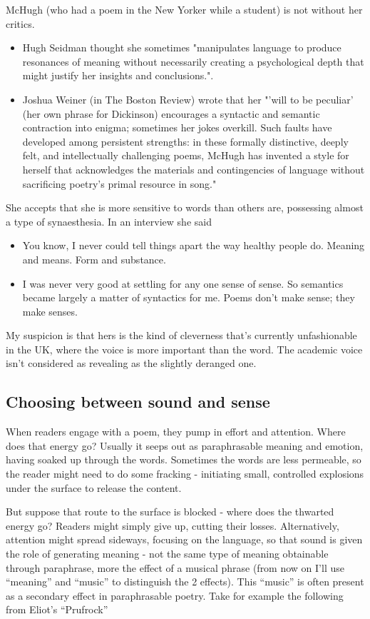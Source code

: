 \documentclass[11pt]{article}
\begin{document}
McHugh (who had a poem in the New Yorker while a student) is not without her critics.
\begin{itemize}
\item    Hugh Seidman thought she sometimes "manipulates language to produce resonances of meaning without necessarily creating a psychological depth that might justify her insights and conclusions.".
\item      Joshua Weiner (in The Boston Review) wrote that her "'will to be peculiar' (her own phrase for Dickinson) encourages a syntactic and semantic contraction into enigma; sometimes her jokes overkill. Such faults have developed among persistent strengths: in these formally distinctive, deeply felt, and intellectually challenging poems, McHugh has invented a style for herself that acknowledges the materials and contingencies of language without sacrificing poetry's primal resource in song."
\end{itemize}
She accepts that she is more sensitive to words than others are, possessing almost a type of synaesthesia. In an interview she said
\begin{itemize}
\item      You know, I never could tell things apart the way healthy people do. Meaning and means. Form and substance.
\item      I was never very good at settling for any one sense of sense. So semantics became largely a matter of syntactics for me. Poems don’t make sense; they make senses.
\end{itemize}
My suspicion is that hers is the kind of cleverness that's currently unfashionable in the UK, where the voice is more important than the word. The academic voice isn't considered as revealing as the slightly deranged one.

\newpage\subsection{Choosing between sound and sense}
When readers engage with a poem, they pump in effort and attention.
Where does that energy go? Usually it seeps out as paraphrasable meaning and
emotion, having soaked up through the words. Sometimes the words are less
permeable, so the reader might need to do some fracking -  initiating small,
controlled explosions under the surface to release the content.

But
suppose that route to the surface is blocked - where does the thwarted energy go? Readers might simply give up, cutting their losses. Alternatively,
attention might spread sideways, focusing on the language, so that sound is given the role of generating meaning - not the same type of meaning obtainable through paraphrase,
more the effect of a musical phrase (from now on I'll use ``meaning'' and ``music'' to distinguish the 2 effects). This ``music'' is often present as a secondary
effect in paraphrasable poetry. Take for example the following from Eliot's ``Prufrock''
\end{document}
